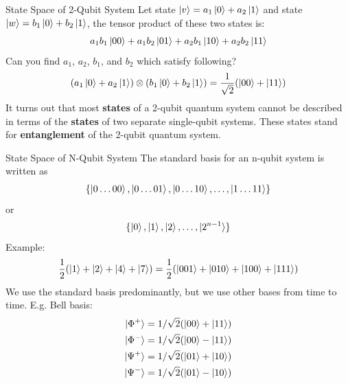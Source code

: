 \documentclass{beamer}
\begin{document}
\begin{frame}{State Space of 2-Qubit System}
{  Let state $\ket{v}=a_1\ket0 + a_2\ket1$ and state $\ket{w}=b_1\ket0 + b_2\ket1$, the tensor product of these two states is:
  \begin{align*}
  a_1b_1\ket{00} + a_1b_2\ket{01} + a_2b_1\ket{10} + a_2b_2\ket{11}
  \end{align*}
  Can you find $a_1$, $a_2$, $b_1$, and $b_2$ which satisfy following?
  \begin{align*}
  (a_1\ket0 + a_2\ket1) \otimes (b_1\ket0 + b_2\ket1) = \frac{1}{\sqrt2}(\ket{00} + \ket{11})
  \end{align*}
  It turns out that most \textbf{states} of a 2-qubit quantum system cannot be described in terms of the \textbf{states} of two separate single-qubit systems.
  These states stand for \textbf{entanglement} of the 2-qubit quantum system.
  }%
\end{frame}

\begin{frame}{State Space of N-Qubit System}
  {\tiny
  The standard basis for an n-qubit system is written as
  \begin{align*}
    \{\ket{0\dots00}, \ket{0\dots01}, \ket{0\dots10}, \dots, \ket{1\dots11}\}
  \end{align*}
  or
  \begin{align*}
    \{\ket{0}, \ket{1}, \ket{2}, \dots, \ket{2^{n-1}}\}
  \end{align*}
  Example:
  \begin{align*}
    \frac{1}{2} (\ket{1} + \ket{2} + \ket{4} + \ket{7}) = \frac{1}{2} (\ket{001} + \ket{010} + \ket{100} + \ket{111})
  \end{align*}
  We use the standard basis predominantly, but we use other bases from time to time. E.g. Bell basis:
  \begin{align*}
    \ket{\Phi^+} &= 1/\sqrt2(\ket{00} + \ket{11}) \\
    \ket{\Phi^-} &= 1/\sqrt2(\ket{00} - \ket{11}) \\
    \ket{\Psi^+} &= 1/\sqrt2(\ket{01} + \ket{10}) \\
    \ket{\Psi^-} &= 1/\sqrt2(\ket{01} - \ket{10})
  \end{align*}
  }%
\end{frame}
\end{document}
